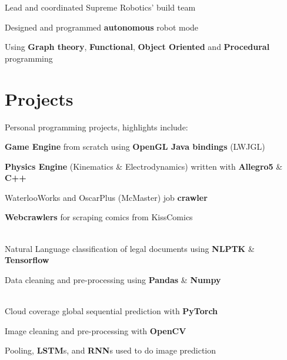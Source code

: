 \documentclass[]{chandan-cv}
\begin{document}
\begin{minipage}[t]{0.73\textwidth}
\begin{tightemize}
	\item Lead and coordinated Supreme Robotics' build team
	\item Designed and programmed \textbf{autonomous} robot mode
	\item Using \textbf{Graph theory}, \textbf{Functional}, \textbf{Object Oriented} and \textbf{Procedural} programming
\end{tightemize}
\sectionsep


\section{Projects}
\descript{ }
\location{ } %
Personal programming projects, highlights include:
\begin{tightemize}
	\item \textbf{Game Engine} from scratch using \textbf{OpenGL Java bindings} (LWJGL)
	\item \textbf{Physics Engine} (Kinematics \& Electrodynamics) written with \textbf{Allegro5} \& \textbf{C++}
	\item WaterlooWorks and OscarPlus (McMaster) job \textbf{crawler}
	\item \textbf{Webcrawlers} for scraping comics from KissComics
\end{tightemize}
\sectionsep
{}
\descript{ }
\location{ } %
\\
Natural Language classification of legal documents using \textbf{NLPTK} \& \textbf{Tensorflow}
\begin{tightemize}
	\item Data cleaning and pre-processing using \textbf{Pandas} \& \textbf{Numpy}
\end{tightemize}
\\
Cloud coverage global sequential prediction with \textbf{PyTorch}
\begin{tightemize}
	\item Image cleaning and pre-processing with \textbf{OpenCV}
	\item Pooling, \textbf{LSTM}s, and \textbf{RNN}s used to do image prediction
\end{tightemize}
\sectionsep


\end{minipage}
\end{document}

